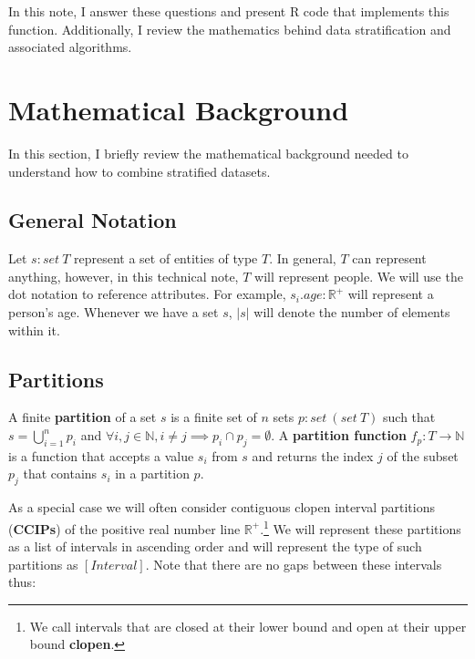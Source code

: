 \documentclass[]{article}
\begin{document}
In this note, I answer these questions and present R code that
implements this function. Additionally, I review the mathematics behind
data stratification and associated algorithms.

\hypertarget{mathematical-background}{%
\section{Mathematical Background}\label{mathematical-background}}

In this section, I briefly review the mathematical background needed to
understand how to combine stratified datasets.

\hypertarget{general-notation}{%
\subsection{General Notation}\label{general-notation}}

Let \(s : set\ T\) represent a set of entities of type \(T\). In
general, \(T\) can represent anything, however, in this technical note,
\(T\) will represent people. We will use the dot notation to reference
attributes. For example, \(s_i.age : \mathbb{R^+}\) will represent a
person's age. Whenever we have a set \(s\), \(|s|\) will denote the
number of elements within it.

\hypertarget{partitions}{%
\subsection{Partitions}\label{partitions}}

A finite \textbf{partition} of a set \(s\) is a finite set of \(n\) sets
\(p : set\ (set\ T)\) such that \(s = \bigcup_{i=1}^n p_i\) and
\(\forall i, j \in \mathbb{N}, i \neq j \implies p_i \cap p_j = \emptyset\).
A \textbf{partition function} \(f_p : T \rightarrow \mathbb{N}\) is a
function that accepts a value \(s_i\) from \(s\) and returns the index
\(j\) of the subset \(p_j\) that contains \(s_i\) in a partition \(p\).

As a special case we will often consider contiguous clopen interval
partitions (\textbf{CCIPs}) of the positive real number line
\(\mathbb{R}^+\).\footnote{We call intervals that are closed at their
  lower bound and open at their upper bound \textbf{clopen}.} We will
represent these partitions as a list of intervals in ascending order and
will represent the type of such partitions as \([Interval]\). Note that
there are no gaps between these intervals thus:
\end{document}
